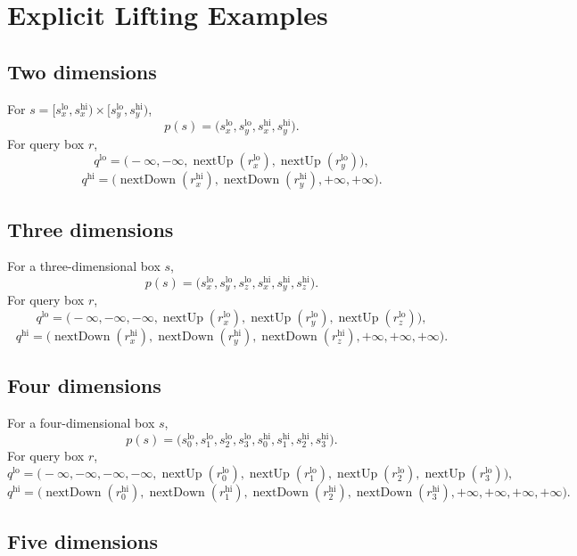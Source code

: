 \documentclass[11pt]{article}
\theoremstyle{definition}
\theoremstyle{plain}
\theoremstyle{remark}
\DeclareMathOperator{\nextUp}{nextUp}
\DeclareMathOperator{\nextDown}{nextDown}
\newcommand{\lo}{\mathrm{lo}}
\newcommand{\hi}{\mathrm{hi}}
\begin{document}
\section{Explicit Lifting Examples}

\subsection{Two dimensions}

For $s=[s_x^{\lo},s_x^{\hi})\times[s_y^{\lo},s_y^{\hi})$,
\[
  p(s)=\bigl(s_x^{\lo},s_y^{\lo},s_x^{\hi},s_y^{\hi}\bigr).
\]
For query box $r$,
\[
  q^{\lo}=\bigl(-\infty,-\infty,\nextUp(r_x^{\lo}),\nextUp(r_y^{\lo})\bigr),
\]
\[
  q^{\hi}=\bigl(\nextDown(r_x^{\hi}),\nextDown(r_y^{\hi}),+\infty,+\infty\bigr).
\]

\subsection{Three dimensions}

For a three-dimensional box $s$,
\[
  p(s)=\bigl(s_x^{\lo},s_y^{\lo},s_z^{\lo},s_x^{\hi},s_y^{\hi},s_z^{\hi}\bigr).
\]
For query box $r$,
\[
  q^{\lo}=\bigl(-\infty,-\infty,-\infty,
    \nextUp(r_x^{\lo}),\nextUp(r_y^{\lo}),\nextUp(r_z^{\lo})\bigr),
\]
\[
  q^{\hi}=\bigl(\nextDown(r_x^{\hi}),\nextDown(r_y^{\hi}),\nextDown(r_z^{\hi}),
    +\infty,+\infty,+\infty\bigr).
\]

\subsection{Four dimensions}

For a four-dimensional box $s$,
\[
  p(s)=\bigl(s_0^{\lo},s_1^{\lo},s_2^{\lo},s_3^{\lo},
              s_0^{\hi},s_1^{\hi},s_2^{\hi},s_3^{\hi}\bigr).
\]
For query box $r$,
\[
  q^{\lo}=\bigl(-\infty,-\infty,-\infty,-\infty,
    \nextUp(r_0^{\lo}),\nextUp(r_1^{\lo}),\nextUp(r_2^{\lo}),\nextUp(r_3^{\lo})\bigr),
\]
\[
  q^{\hi}=\bigl(\nextDown(r_0^{\hi}),\nextDown(r_1^{\hi}),
    \nextDown(r_2^{\hi}),\nextDown(r_3^{\hi}),
    +\infty,+\infty,+\infty,+\infty\bigr).
\]

\subsection{Five dimensions}
\end{document}
